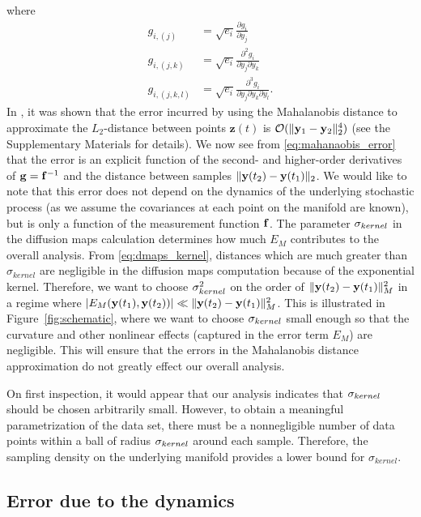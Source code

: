 %
where
%
\begin{equation}
\begin{aligned}
g_{i,(j)} &= \sqrt{e_i} \frac{\partial g_i}{\partial y_j}
\\
g_{i,(j,k)} &= \sqrt{e_i}  \frac{\partial^2 g_i}{\partial y_j \partial y_k}
\\
g_{i,(j,k,l)} &= \sqrt{e_i}  \frac{\partial^3 g_i}{\partial y_j \partial y_k \partial y_l} .
\end{aligned}
\end{equation}
%
In \cite{singer2008non}, it was shown that the error incurred by using the Mahalanobis distance to approximate the $L_2$-distance between points $\mathbf{z}(t)$ is $\mathcal{O} (\|\mathbf{y}_1 - \mathbf{y}_2 \|_2^4 )$ (see the Supplementary Materials for details).
%
We now see from \eqref{eq:mahanaobis_error} that the error is an explicit function of the second- and higher-order derivatives of $\mathbf{g} = \mathbf{f}^{-1}$ and the distance between samples $\| \mathbf{y}(t_2) - \mathbf{y}(t_1) \|_2$.
%
We would like to note that this error does not depend on the dynamics of the underlying stochastic process (as we assume the covariances at each point on the manifold are known), but is only a function of the measurement function $\mathbf{f}$.
%
The parameter $\sigma_{kernel}$ in the diffusion maps calculation determines how much $E_M$ contributes to the overall analysis.
%
From \eqref{eq:dmaps_kernel}, distances which are much greater than $\sigma_{kernel}$ are negligible in the diffusion maps computation because of the exponential kernel.
%
Therefore, we want to choose $\sigma_{kernel}^2$ on the order of $\|\mathbf{y}(t_2) - \mathbf{y}(t_1)\|^2_M$ in a regime where $| E_M(\mathbf{y}(t_1), \mathbf{y}(t_2))|  \ll \|\mathbf{y}(t_2) - \mathbf{y}(t_1)\|^2_M$.
%
This is illustrated in Figure~\ref{fig:schematic}, where we want to choose $\sigma_{kernel}$ small enough so that the curvature and other nonlinear effects (captured in the error term $E_M$) are negligible.
%
This will ensure that the errors in the Mahalanobis distance approximation do not greatly effect our overall analysis.

On first inspection, it would appear that our analysis indicates that $\sigma_{kernel}$ should be chosen arbitrarily small.
%
However, to obtain a meaningful parametrization of the data set, there must be a nonnegligible number of data points within a ball of radius $\sigma_{kernel}$ around each sample.
%
Therefore, the sampling density on the underlying manifold provides a lower bound for $\sigma_{kernel}$.

\subsection{Error due to the dynamics} \label{subsec:cov_est}

